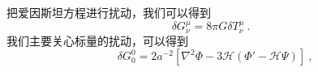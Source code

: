 把爱因斯坦方程进行扰动，我们可以得到
\begin{equation}
\delta G^\mu_\nu = 8 \pi G\delta T^\mu_\nu ~.
\end{equation}
我们主要关心标量的扰动，可以得到
\begin{equation}
\begin{aligned}

\end{aligned}

\delta G^0_0 = 2 a^{-2} [\nabla^2 \Phi- 3 \mathcal H(\Phi' - \mathcal H \Psi)] ~, 
\end{equation}

